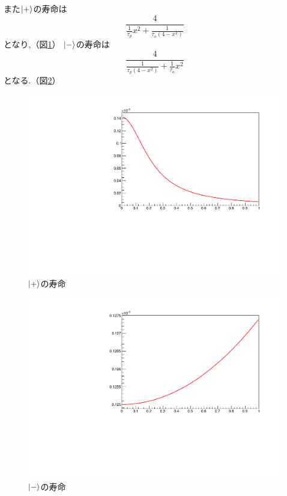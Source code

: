 また$\ket{+}$の寿命は
\begin{equation}
	\nonumber
\frac{4}{\frac{1}{\tau_{p}}x^{2}+\frac{1}{\tau_{o}(4-x^{2})}}
\end{equation}
となり,（図\ref{fig:pluslife}）
$\ket{-}$の寿命は
\begin{equation}
	\nonumber
\frac{4}{\frac{1}{\tau_{p}(4-x^{2})}+\frac{1}{\tau_{o}}x^{2}}
\end{equation}
となる.（図\ref{fig:minuslife}）

\begin{figure}[H]
\centering
\includegraphics[keepaspectratio,angle=270,scale=0.6]{fig/ybm/pluslife.pdf}
\caption{$\ket{+}$の寿命}
\label{fig:pluslife}
\end{figure}

\begin{figure}[H]
\centering
\includegraphics[keepaspectratio,angle=270,scale=0.6]{fig/ybm/minuslife.pdf}
\caption{$\ket{-}$の寿命}
\label{fig:minuslife}
\end{figure}


